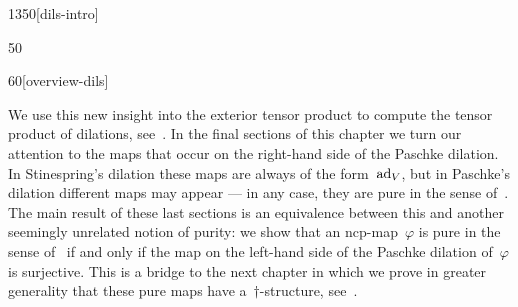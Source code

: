 \begin{parsec}{1350}[dils-intro]
\begin{point}{50}
\begin{point}{60}[overview-dils]
\begin{enumerate}
\end{enumerate}
We use this new insight into the exterior tensor product
    to compute the tensor product
    of dilations, see~.
In the final sections of this chapter we turn our attention to the maps
    that occur on the right-hand side of the Paschke dilation.
In Stinespring's dilation these maps are always of the form~$\mathrm{ad}_V$,
    but in Paschke's dilation different maps may appear ---
    in any case, they are pure in the sense of~.
The main result of these last sections
    is an equivalence between this and another
    seemingly unrelated notion of purity:
    we show that an ncp-map~$\varphi$ is pure in the sense of~
    if and only if the map on the left-hand side of
    the Paschke dilation of~$\varphi$ is surjective.
This is a bridge to the next chapter
    in which we prove in greater generality
    that these pure maps have a~$\dagger$-structure,
    see~.
\end{point}
\end{point}
\end{parsec}


